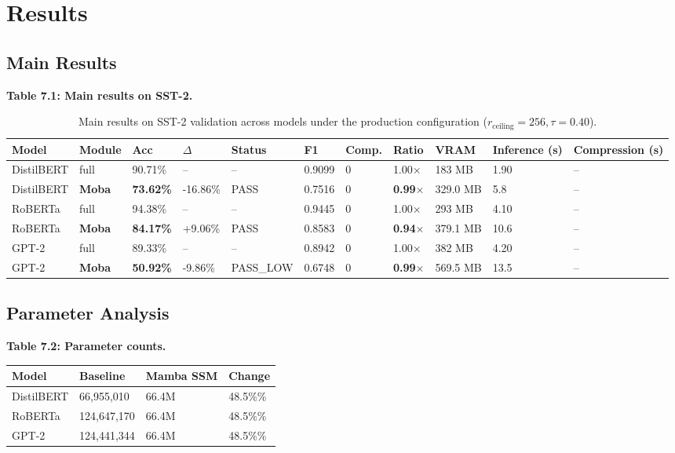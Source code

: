 \section{Results}

\subsection{Main Results}

\textbf{Table 7.1: Main results on SST-2.}

\begin{table}[t]
\centering
\small
\begin{tabular}{lllllllllll}
\toprule
\textbf{Model} & \textbf{Module} & \textbf{Acc} & \textbf{$\Delta$} & \textbf{Status} & \textbf{F1} & \textbf{Comp.} & \textbf{Ratio} & \textbf{VRAM} & \textbf{Inference (s)} & \textbf{Compression (s)} \\
\midrule
DistilBERT & full & 90.71\% & -- & -- & 0.9099 & 0 & 1.00$\times$ & 183 MB & 1.90 & -- \\
DistilBERT & \textbf{Moba} & \textbf{73.62\%} & -16.86\% & PASS & 0.7516 & 0 & \textbf{0.99$\times$} & 329.0 MB & 5.8 & -- \\
RoBERTa & full & 94.38\% & -- & -- & 0.9445 & 0 & 1.00$\times$ & 293 MB & 4.10 & -- \\
RoBERTa & \textbf{Moba} & \textbf{84.17\%} & +9.06\% & PASS & 0.8583 & 0 & \textbf{0.94$\times$} & 379.1 MB & 10.6 & -- \\
GPT-2 & full & 89.33\% & -- & -- & 0.8942 & 0 & 1.00$\times$ & 382 MB & 4.20 & -- \\
GPT-2 & \textbf{Moba} & \textbf{50.92\%} & -9.86\% & PASS\_LOW & 0.6748 & 0 & \textbf{0.99$\times$} & 569.5 MB & 13.5 & -- \\
\bottomrule
\end{tabular}
\caption{Main results on SST-2 validation across models under the production configuration ($r_{\mathrm{ceiling}}=256, \tau=0.40$).}
\label{tab:main_sst2}
\end{table}

\subsection{Parameter Analysis}

\textbf{Table 7.2: Parameter counts.}

\begin{table}[H]
\centering
\small
\begin{tabular}{llll}
\toprule
\textbf{Model} & \textbf{Baseline} & \textbf{Mamba SSM} & \textbf{Change} \\
\midrule
DistilBERT & 66,955,010 & 66.4M & 48.5\%\% \\
RoBERTa & 124,647,170 & 66.4M & 48.5\%\% \\
GPT-2 & 124,441,344 & 66.4M & 48.5\%\% \\
\bottomrule
\end{tabular}
\end{table}

